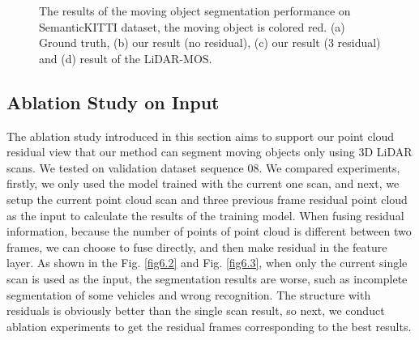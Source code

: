 \documentclass[lettersize,journal]{IEEEtran}
\begin{document}
\begin{figure}[t]
{\label{fig6.3}}
\hfil
{}

\caption{The results of the moving object segmentation performance on SemanticKITTI dataset, the moving object is colored red. (a) Ground truth, (b) our result (no residual), (c) our result (3 residual) and (d) result of the LiDAR-MOS.}
\label{fig_6}
\end{figure}



\subsection{Ablation Study on Input}

The ablation study introduced in this section aims to support our point cloud residual view that our method can segment moving objects only using 3D LiDAR scans. We tested on validation dataset sequence 08. We compared experiments, firstly, we only used the model trained with the current one scan, and next, we setup the current point cloud scan and three previous frame residual point cloud as the input to calculate the results of the training model. When fusing residual information, because the number of points of point cloud is different between two frames, we can choose to fuse directly, and then make residual in the feature layer. As shown in the Fig. \ref{fig6.2} and Fig. \ref{fig6.3}, when only the current single scan is used as the input, the segmentation results are worse, such as incomplete segmentation of some vehicles and wrong recognition. The structure with residuals is obviously better than the single scan result, so next, we conduct ablation experiments to get the residual frames corresponding to the best results.
\end{document}
